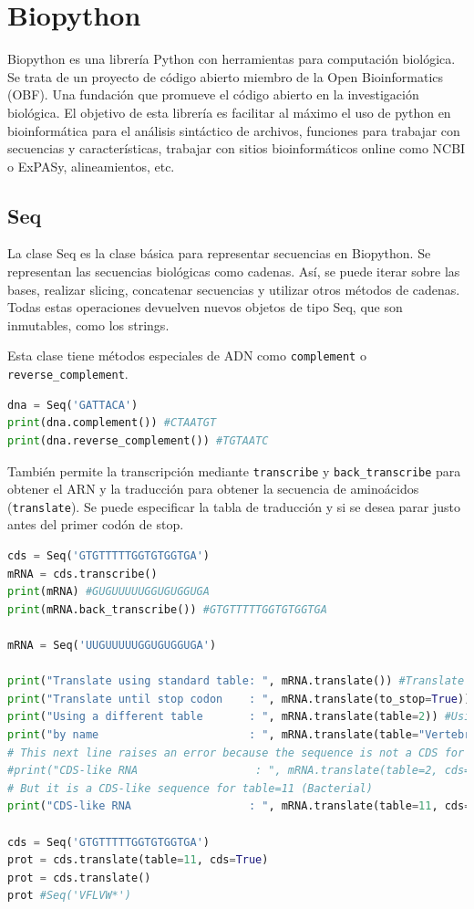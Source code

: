 \section{Biopython}
Biopython es una librería Python con herramientas para computación biológica. Se trata de un proyecto de código abierto miembro de la Open Bioinformatics (OBF). Una fundación que promueve el código abierto en la investigación biológica.
El objetivo de esta librería es facilitar al máximo el uso de python en bioinformática para el análisis sintáctico de archivos, funciones para trabajar con secuencias y características, trabajar con sitios bioinformáticos online como NCBI o ExPASy, alineamientos, etc.

\subsection{Seq}
La clase Seq es la clase básica para representar secuencias en Biopython. Se representan las secuencias biológicas como cadenas. Así, se puede iterar sobre las bases, realizar slicing, concatenar secuencias y utilizar otros métodos de cadenas. Todas estas operaciones devuelven nuevos objetos de tipo Seq, que son inmutables, como los strings.

Esta clase tiene métodos especiales de ADN como \texttt{complement} o \texttt{reverse\_complement}. 
\begin{lstlisting}[language=Python]
dna = Seq('GATTACA')
print(dna.complement()) #CTAATGT
print(dna.reverse_complement()) #TGTAATC
\end{lstlisting}

También permite la transcripción mediante \texttt{transcribe} y \texttt{back\_transcribe} para obtener el ARN y la traducción para obtener la secuencia de aminoácidos (\texttt{translate}). Se puede especificar la tabla de traducción y si se desea parar justo antes del primer codón de stop.
\begin{lstlisting}[language=Python]
cds = Seq('GTGTTTTTGGTGTGGTGA')
mRNA = cds.transcribe()
print(mRNA) #GUGUUUUUGGUGUGGUGA
print(mRNA.back_transcribe()) #GTGTTTTTGGTGTGGTGA

mRNA = Seq('UUGUUUUUGGUGUGGUGA')

print("Translate using standard table: ", mRNA.translate()) #Translate using standard table:  LFLVW*
print("Translate until stop codon    : ", mRNA.translate(to_stop=True)) #Translate until stop codon    :  LFLVW
print("Using a different table       : ", mRNA.translate(table=2)) #Using a different table       :  LFLVWW
print("by name                       : ", mRNA.translate(table="Vertebrate Mitochondrial")) #by name                       :  LFLVWW
# This next line raises an error because the sequence is not a CDS for table=2
#print("CDS-like RNA                  : ", mRNA.translate(table=2, cds=True)) #CDS-like RNA                  :  MFLVW
# But it is a CDS-like sequence for table=11 (Bacterial)
print("CDS-like RNA                  : ", mRNA.translate(table=11, cds=True)) #CDS-like RNA                  :  MFLVW

cds = Seq('GTGTTTTTGGTGTGGTGA')
prot = cds.translate(table=11, cds=True)
prot = cds.translate()
prot #Seq('VFLVW*')
\end{lstlisting}

